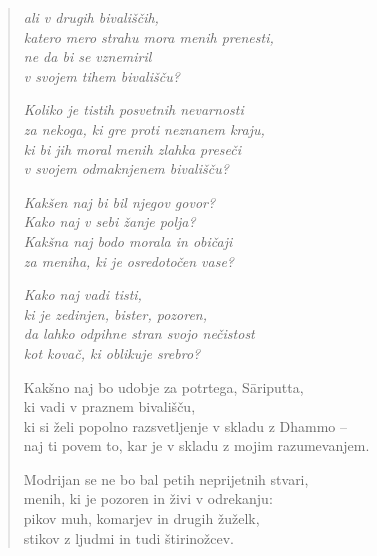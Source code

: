 \clearpage
\begin{verse}

\emph{ali v drugih bivališčih,}\\
\emph{katero mero strahu mora menih prenesti,}\\
\emph{ne da bi se vznemiril}\\
\emph{v svojem tihem bivališču?}

\emph{Koliko je tistih posvetnih nevarnosti}\\
\emph{za nekoga, ki gre proti neznanem kraju,}\\
\emph{ki bi jih moral menih zlahka preseči}\\
\emph{v svojem odmaknjenem bivališču?}

\emph{Kakšen naj bi bil njegov govor?}\\
\emph{Kako naj v sebi žanje polja?}\\
\emph{Kakšna naj bodo morala in običaji}\\
\emph{za meniha, ki je osredotočen vase?}

\emph{Kako naj vadi tisti,}\\
\emph{ki je zedinjen, bister, pozoren,}\\
\emph{da lahko odpihne stran svojo nečistost}\\
\emph{kot kovač, ki oblikuje srebro?}

Kakšno naj bo udobje za potrtega, Sāriputta,\\
ki vadi v praznem bivališču,\\
ki si želi popolno razsvetljenje v skladu z Dhammo --\\
naj ti povem to, kar je v skladu z mojim razumevanjem.

Modrijan se ne bo bal petih neprijetnih stvari,\\
menih, ki je pozoren in živi v odrekanju:\\
pikov muh, komarjev in drugih žuželk,\\
stikov z ljudmi in tudi štirinožcev.

\end{verse}


